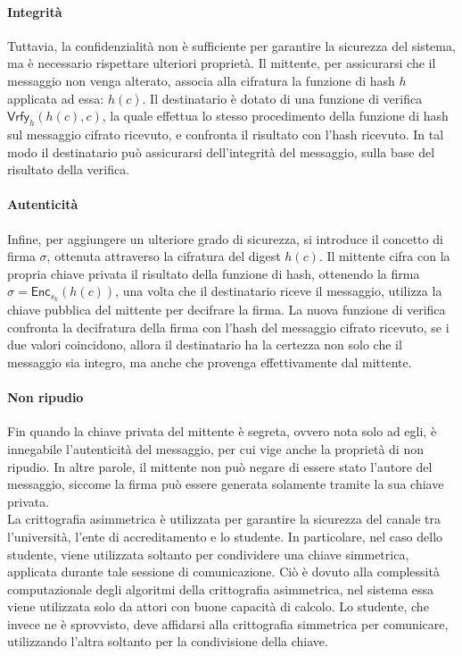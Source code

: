 \documentclass[a4paper,12pt]{article}
\begin{document}
\paragraph{Integrità}
Tuttavia, la confidenzialità non è sufficiente per garantire la sicurezza del sistema, ma è necessario rispettare ulteriori proprietà.
Il mittente, per assicurarsi che il messaggio non venga alterato, associa alla cifratura la funzione di hash $h$ applicata ad essa: $h(c)$. Il destinatario è dotato di una funzione di verifica $\mathsf{Vrfy}_{h}(h(c),c)$, la quale effettua lo stesso procedimento della funzione di hash sul messaggio cifrato ricevuto, e confronta il risultato con l'hash ricevuto. In tal modo il destinatario può assicurarsi dell'integrità del messaggio, sulla base del risultato della verifica.  
\paragraph{Autenticità}
Infine, per aggiungere un ulteriore grado di sicurezza, si introduce il concetto di firma $\sigma$, ottenuta attraverso la cifratura del digest $h(c)$. 
Il mittente cifra con la propria chiave privata il risultato della funzione di hash, ottenendo la firma $\sigma=\mathsf{Enc}_{s_k}(h(c))$, una volta che il destinatario riceve il messaggio, utilizza la chiave pubblica del mittente per decifrare la firma. La nuova funzione di verifica confronta la decifratura della firma con l'hash del messaggio cifrato ricevuto, se i due valori coincidono, allora il destinatario ha la certezza non solo che il messaggio sia integro, ma anche che provenga effettivamente dal mittente.
\paragraph{Non ripudio}
Fin quando la chiave privata del mittente è segreta, ovvero nota solo ad egli, è innegabile l'autenticità del messaggio, per cui vige anche la proprietà di non ripudio. In altre parole, il mittente non può negare di essere stato l'autore del messaggio, siccome la firma può essere generata solamente tramite la sua chiave privata.
\\[1em] La crittografia asimmetrica è utilizzata per garantire la sicurezza del canale tra l'università, l'ente di accreditamento e lo studente. In particolare, nel caso dello studente, viene utilizzata soltanto per condividere una chiave simmetrica, applicata durante tale sessione di comunicazione. Ciò è dovuto alla complessità computazionale degli algoritmi della crittografia asimmetrica, nel sistema essa viene utilizzata solo da attori con buone capacità di calcolo. 
Lo studente, che invece ne è sprovvisto, deve affidarsi alla crittografia simmetrica per comunicare, utilizzando l'altra soltanto per la condivisione della chiave.
\end{document}
